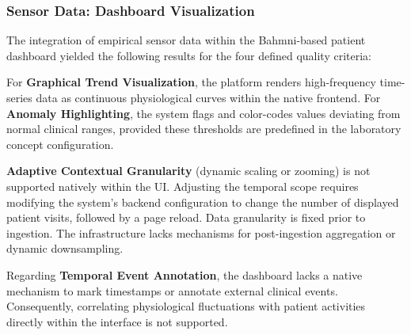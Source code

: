 \subsubsection*{Sensor Data: Dashboard Visualization}
The integration of empirical sensor data within the Bahmni-based patient dashboard yielded the following results for the four defined quality criteria:

For \textbf{Graphical Trend Visualization}, the platform renders high-frequency time-series data as continuous physiological curves within the native frontend. For \textbf{Anomaly Highlighting}, the system flags and color-codes values deviating from normal clinical ranges, provided these thresholds are predefined in the laboratory concept configuration.

\textbf{Adaptive Contextual Granularity} (dynamic scaling or zooming) is not supported natively within the UI. Adjusting the temporal scope requires modifying the system's backend configuration to change the number of displayed patient visits, followed by a page reload. Data granularity is fixed prior to ingestion. The infrastructure lacks mechanisms for post-ingestion aggregation or dynamic downsampling. 

Regarding \textbf{Temporal Event Annotation}, the dashboard lacks a native mechanism to mark timestamps or annotate external clinical events. Consequently, correlating physiological fluctuations with patient activities directly within the interface is not supported.